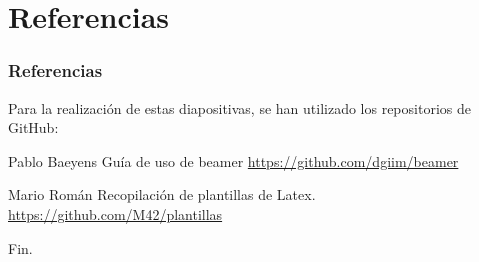 \documentclass[12pt, aspectratio=169]{beamer} %
\begin{document}
\section{Referencias}
	\begin{frame}
		\frametitle{Referencias}
		
		Para la realización de estas diapositivas, se han utilizado los repositorios de GitHub:
		
		\footnotesize{
		  \begin{thebibliography}{7} %
		     Pablo Baeyens
		      \newblock Guía de uso de beamer
		      \newblock \url{https://github.com/dgiim/beamer}
		      
		     Mario Román
		      \newblock Recopilación de plantillas de Latex.
		      \newblock \url{https://github.com/M42/plantillas}
		  \end{thebibliography}
		}
	\end{frame}


\begin{frame}
\Huge{\centerline{Fin.}}
\end{frame}

\end{document}
